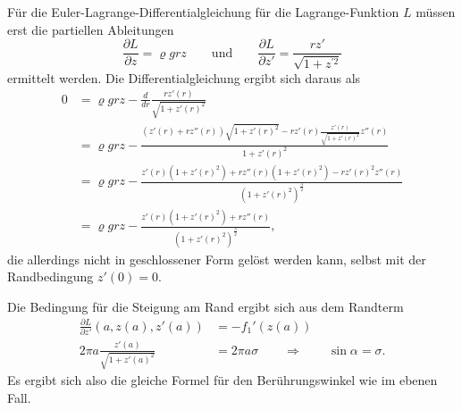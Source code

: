 Für die Euler-Lagrange-Differentialgleichung für die Lagrange-Funktion $L$
müssen erst die partiellen Ableitungen
\[
\frac{\partial L}{\partial z}
=
\varrho g r z
\qquad\text{und}\qquad
\frac{\partial L}{\partial z'}
=
\frac{rz'}{\sqrt{1+z^{\prime 2}}}
\]
ermittelt werden.
Die Differentialgleichung ergibt sich daraus als
\begin{align*}
0
&=
\varrho grz
-
\frac{d}{dr}
\frac{rz'(r)}{\sqrt{1+z'(r)^2}}
\\
&=
\varrho grz
-
\frac{
\displaystyle
(z'(r)+rz''(r))\sqrt{1+z'(r)^2}
-
rz'(r)\frac{z'(r)}{\sqrt{1+z'(r)^2}}z''(r)
}{
1+z'(r)^2
}
\\
&=
\varrho grz
-
\frac{
z'(r)(1+z'(r)^2)
+
rz''(r)(1+z'(r)^2)
-
rz'(r)^2z''(r)
}{
(1+z'(r)^2)^{\frac32}
}
\\
&=
\varrho grz
-
\frac{
z'(r)(1+z'(r)^2)
+
rz''(r)
}{
(1+z'(r)^2)^{\frac32}
},
\end{align*}
die allerdings nicht in geschlossener Form gelöst werden kann, selbst
mit der Randbedingung $z'(0)=0$.

Die Bedingung für die Steigung am Rand ergibt sich aus dem Randterm
\begin{align*}
\frac{\partial L}{\partial z'}(a, z(a), z'(a))
&=
-
f_1'(z(a))
\\
2\pi a
\frac{z'(a)}{\sqrt{1+z'(a)^2}}
&=
2\pi a \sigma
\qquad\Rightarrow\qquad
\sin\alpha = \sigma.
\end{align*}
Es ergibt sich also die gleiche Formel für den Berührungswinkel wie
%
im ebenen Fall.




